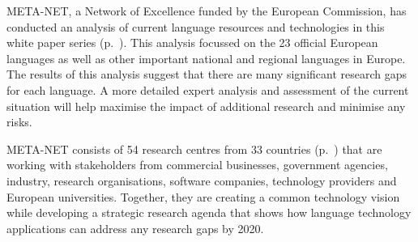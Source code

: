 \begin{Parallel}[c]{78mm}{78mm}
{META-NET, a Network of Excellence funded by the European Commission, has conducted an  analysis of current language resources and technologies in this white paper series (p.~\pageref{whitepaperseries}). This analysis focussed on the 23 official European languages as well as other important national and regional languages in Europe. The results of this analysis suggest that there are many significant research gaps for each language. A more detailed expert analysis and assessment of the current situation will help maximise the impact of additional research and minimise any risks.

META-NET consists of 54 research centres from 33 countries (p.~\pageref{metanetmembers}) that are working with stakeholders from commercial businesses, government agencies, industry, research organisations, software companies, technology providers and European universities. Together, they are creating a common technology vision while developing a strategic research agenda that shows how language technology applications can address any research gaps by 2020.} 
\ParallelPar
\end{Parallel}

\cleardoublepage


\renewcommand\contentsname{}

\tableofcontents
{}

\cleardoublepage


\setcounter{page}{1}
\pagestyle{scrheadings}





